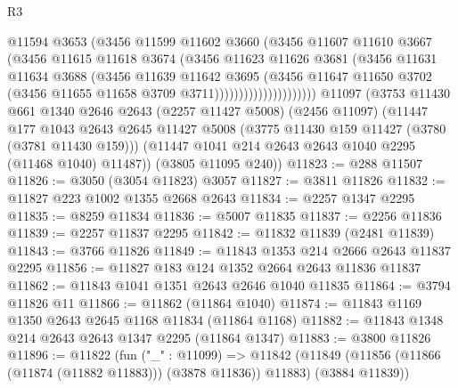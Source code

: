 \begin{lexlean}{R3}
\begin{coremodule}
                              @11594
                              @3653
                              (@3456
                                @11599
                                @11602
                                @3660
                                (@3456
                                  @11607
                                  @11610
                                  @3667
                                  (@3456
                                    @11615
                                    @11618
                                    @3674
                                    (@3456
                                      @11623
                                      @11626
                                      @3681
                                      (@3456
                                        @11631
                                        @11634
                                        @3688
                                        (@3456
                                          @11639
                                          @11642
                                          @3695
                                          (@3456
                                            @11647
                                            @11650
                                            @3702
                                            (@3456 @11655 @11658 @3709 @3711)))))))))))))))))))))
    @11097
    (@3753
      @11430
      @661
      @1340
      @2646
      @2643
      (@2257 @11427 @5008)
      (@2456 @11097)
      (@11447
        @177
        @1043
        @2643
        @2645
        @11427
        @5008
        (@3775 @11430 @159 @11427 (@3780 (@3781 @11430 @159)))
        (@11447 @1041 @214 @2643 @2643 @1040 @2295 (@11468 @1040) @11487))
      (@3805 @11095 @240))
@11823 := @288 @11507
@11826 := @3050 (@3054 @11823) @3057
@11827 := @3811 @11826
@11832 := @11827 @223 @1002 @1355 @2668 @2643
@11834 := @2257 @1347 @2295
@11835 := @8259 @11834
@11836 := @5007 @11835
@11837 := @2256 @11836
@11839 := @2257 @11837 @2295
@11842 := @11832 @11839 (@2481 @11839)
@11843 := @3766 @11826
@11849 := @11843 @1353 @214 @2666 @2643 @11837 @2295
@11856 := @11827 @183 @124 @1352 @2664 @2643 @11836 @11837
@11862 := @11843 @1041 @1351 @2643 @2646 @1040 @11835
@11864 := @3794 @11826 @11
@11866 := @11862 (@11864 @1040)
@11874 := @11843 @1169 @1350 @2643 @2645 @1168 @11834 (@11864 @1168)
@11882 := @11843 @1348 @214 @2643 @2643 @1347 @2295 (@11864 @1347)
@11883 := @3800 @11826
@11896 := @11822
    (fun ("_" : @11099) =>
    @11842 (@11849 (@11856 (@11866 (@11874 (@11882 @11883))) (@3878 @11836)) @11883) (@3884 @11839))

\end{coremodule}
\end{lexlean}

